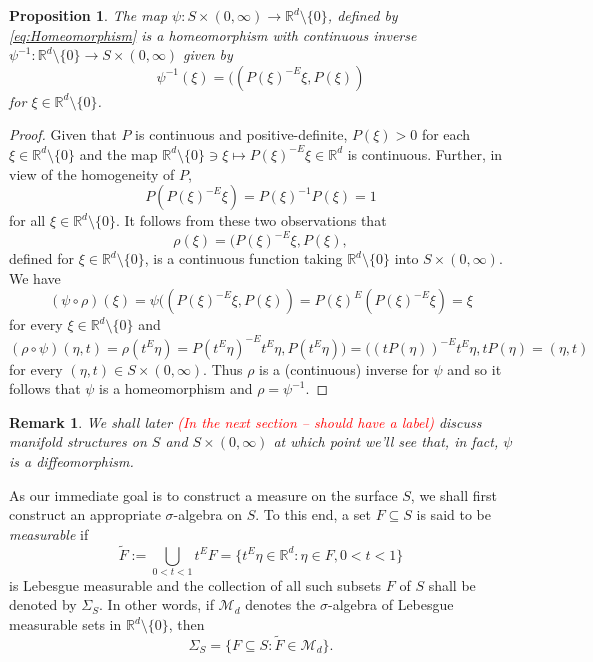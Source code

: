 \documentclass[11pt]{article}
\theoremstyle{theorem}
\newtheorem{proposition}[theorem]{Proposition}
\newtheorem{remark}{Remark}
\begin{document}
\begin{proposition}\label{prop:PsiHomeomorphism}
The map $\psi:S\times (0,\infty)\to\mathbb{R}^d\setminus\{0\}$, defined by \eqref{eq:Homeomorphism} is a homeomorphism with continuous inverse $\psi^{-1}:\mathbb{R}^d\setminus\{0\}\to S\times (0,\infty)$ given by
\begin{equation*}
\psi^{-1}(\xi)=((P(\xi)^{-E}\xi,P(\xi))
\end{equation*}
for $\xi\in\mathbb{R}^d\setminus\{0\}$.
\end{proposition}

\begin{proof}
Given that $P$ is continuous and positive-definite, $P(\xi)>0$ for each $\xi\in \mathbb{R}^d\setminus\{0\}$ and the map $\mathbb{R}^d\setminus\{0\}\ni \xi \mapsto P(\xi)^{-E}\xi\in \mathbb{R}^d$ is continuous. Further, in view of the homogeneity of $P$,
\begin{equation*}
P\left(P(\xi)^{-E}\xi\right)=P(\xi)^{-1}P(\xi)=1
\end{equation*}
for all $\xi\in\mathbb{R}^d\setminus\{0\}$. It follows from these two observations that
\begin{equation*}
\rho(\xi)=(P(\xi)^{-E}\xi,P(\xi),
\end{equation*}
defined for $\xi\in\mathbb{R}^d\setminus\{0\}$, is a continuous function taking $\mathbb{R}^d\setminus\{0\}$ into $S\times (0,\infty)$. We have
\begin{equation*}
(\psi\circ \rho)(\xi)=\psi((P(\xi)^{-E}\xi,P(\xi))=P(\xi)^{E}(P(\xi)^{-E}\xi)=\xi
\end{equation*}
for every $\xi\in \mathbb{R}^d\setminus \{0\}$ and
\begin{equation*}
(\rho\circ\psi)(\eta,t)=\rho(t^E\eta)=P(t^{E}\eta)^{-E}t^{E}\eta,P(t^{E}\eta))=((tP(\eta))^{-E}t^E\eta,tP(\eta)=(\eta,t)
\end{equation*}
for every $(\eta,t)\in S\times (0,\infty)$. Thus $\rho$ is a (continuous) inverse for $\psi$ and so it follows that $\psi$ is a homeomorphism and $\rho=\psi^{-1}$.
\end{proof}


\begin{remark}We shall later \textcolor{red}{(In the next section -- should have a label)} discuss manifold structures on $S$ and $S\times (0,\infty)$ at which point we'll see that, in fact, $\psi$ is a diffeomorphism.
\end{remark}

\noindent As our immediate goal is to construct a measure on the surface $S$, we shall first construct an appropriate $\sigma$-algebra on $S$. To this end, a set $F\subseteq S$ is said to be \textit{measurable} if
\begin{equation*}
\widetilde F:=\bigcup_{0<t<1}t^E F=\{t^E\eta\in\mathbb{R}^d:\eta\in F,0<t<1\}
\end{equation*}
is Lebesgue measurable and the collection of all such subsets $F$ of $S$ shall be denoted by $\Sigma_S$. In other words, if $\mathcal{M}_d$ denotes the $\sigma$-algebra of Lebesgue measurable sets in $\mathbb{R}^d\setminus\{0\}$, then
\begin{equation*}
\Sigma_S=\{F\subseteq S:\widetilde{F}\in\mathcal{M}_d\}.
\end{equation*}
\end{document}
